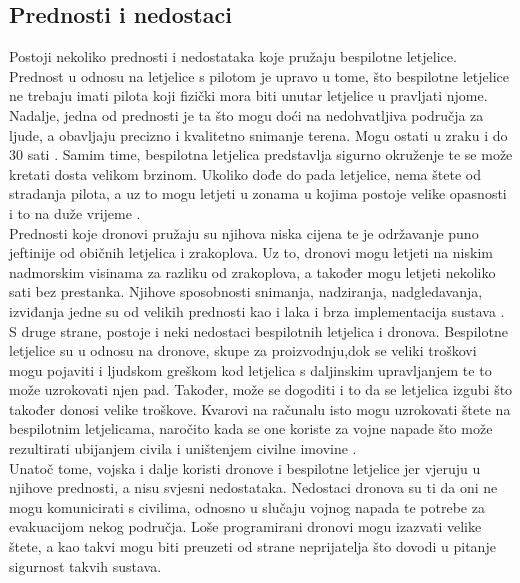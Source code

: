 \documentclass[times, utf8, diplomski]{fer}
\begin{document}
\subsection{Prednosti i nedostaci}
Postoji nekoliko prednosti i nedostataka koje pružaju bespilotne letjelice. Prednost u odnosu na letjelice s pilotom je upravo u tome, što bespilotne letjelice ne trebaju imati pilota 
koji fizički  mora  biti  unutar  letjelice  u
pravljati  njome.  Nadalje, jedna od prednosti je ta što mogu doći na nedohvatljiva područja za ljude, a obavljaju precizno i kvalitetno snimanje terena. Mogu ostati u zraku i do 30 sati \citep{AdvantagesofUAS}. Samim time, bespilotna letjelica predstavlja sigurno okruženje te se može kretati dosta velikom brzinom. Ukoliko dođe do pada letjelice, nema štete od stradanja pilota, a uz to mogu letjeti u zonama u kojima postoje velike opasnosti i to na duže vrijeme \citep{Soffar}. \\
Prednosti koje dronovi pružaju su njihova niska cijena te je održavanje puno jeftinije od običnih letjelica i zrakoplova. Uz to, dronovi mogu letjeti na niskim nadmorskim visinama za razliku od zrakoplova, a također mogu letjeti nekoliko sati bez prestanka. Njihove sposobnosti snimanja, nadziranja, nadgledavanja, izviđanja jedne su od velikih prednosti kao i laka i brza implementacija sustava \citep{PhilForHumanity}.\\
S  druge  strane,  postoje  i  neki  nedostaci  bespilotnih  letjelica  i  dronova. Bespilotne letjelice su u odnosu na dronove, skupe za proizvodnju,dok se veliki troškovi mogu pojaviti i ljudskom greškom kod letjelica s daljinskim upravljanjem te to može uzrokovati njen pad. Također, može se dogoditi i to da se letjelica izgubi što također donosi velike troškove. Kvarovi na računalu isto mogu uzrokovati štete na bespilotnim letjelicama, naročito kada se one koriste za vojne napade što može rezultirati ubijanjem civila i uništenjem  civilne  imovine \citep{Soffar}. \\
Unatoč tome, vojska i dalje koristi dronove i  bespilotne letjelice jer vjeruju u njihove prednosti, a nisu svjesni nedostataka. Nedostaci dronova su ti da oni ne mogu komunicirati s civilima, odnosno u slučaju vojnog napada te potrebe za evakuacijom nekog područja. Loše programirani dronovi mogu izazvati velike štete, a kao takvi mogu biti preuzeti od strane neprijatelja što dovodi u pitanje sigurnost takvih sustava. 


 
\end{document}
